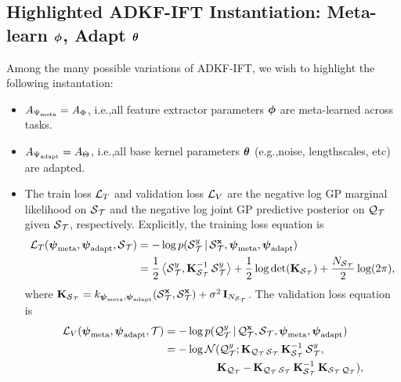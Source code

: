    \subsection[Highlighted ADKF-IFT Instantiation]{Highlighted ADKF-IFT Instantiation: Meta-learn $\bfphi$, Adapt $\bftheta$}\label{sec:specific-implementation}
    Among the many possible variations of ADKF-IFT,
    we wish to highlight the following instantation:
    \begin{itemize}
        \item $A_{\Psimeta}=A_\Phi$, i.e.,\@ all feature extractor parameters $\bfphi$ are meta-learned across tasks.
        \item $A_{\Psiml}=A_\Theta$, i.e.,\@ all base kernel parameters $\bftheta$ (e.g.,\@ noise, lengthscales, etc) are adapted.
        \item The train loss $\loss_T$ and validation loss $\loss_V$
        are the negative log GP marginal likelihood on $\support_{\task}$
        and the negative log joint GP predictive posterior on $\query_{\task}$ given $\support_{\task}$,
        respectively.
        Explicitly, the training loss equation is
        \begin{equation}
            \begin{split}
                \loss_T(\psimeta,\psiml,\support_{\task}) 
                &= -\log p(\support^y_{\task}|\support^{\bfx}_{\task},\psimeta,\psiml)\\
                &=\frac{1}{2}\left<\support^y_{\task} ,\bfK_{\support_{\task} }^{-1}\support^y_{\task} \right> + \frac{1}{2}\log\det (\bfK_{\support_{\task} }) + \frac{N_{\support_{\task} }}{2}\log(2\pi),\label{eq:train_loss}
            \end{split}
        \end{equation}
        where $\bfK_{\support_{\task} }=k_{\psimeta,\psiml}(\support^{\bfx}_{\task},\support^{\bfx}_{\task})+\sigma^2\bfI_{N_{\support_{\task}}}$.
        The validation loss equation is
        \begin{equation}
        \begin{split}
            \loss_V(\psimeta,\psiml,\task) 
            &= -\log p(\query^y_{\task}|\query^{\bfx}_{\task},\support_{\task},\psimeta,\psiml)\\
            &= -\log \calN(\query^y_{\task};\bfK_{\query_{\task}\support_{\task}}\bfK_{\support_{\task}}^{-1}\support^y_{\task}, \\
            &\qquad\qquad\ \  \bfK_{\query_{\task}}-\bfK_{\query_{\task}\support_{\task}}\bfK_{\support_{\task}}^{-1}\bfK_{\support_{\task}\query_{\task}}),\label{eq:val_loss}

\end{split}
\end{equation}
\end{itemize}
